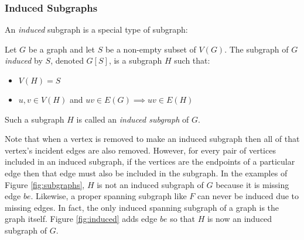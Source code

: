 \subsubsection{Induced Subgraphs}

An \emph{induced} subgraph is a special type of subgraph:

\begin{definition}
  Let \(G\) be a graph and let \(S\) be a non-empty subset of \(V(G)\).  The subgraph of \(G\) \emph{induced} by
  \(S\), denoted \(G[S]\), is a subgraph \(H\) such that:
  \begin{itemize}
  \item \(V(H)=S\)
  \item \(u,v\in V(H)\) and \(uv\in E(G)\implies uv\in E(H)\)
  \end{itemize}
  Such a subgraph \(H\) is called an \emph{induced subgraph} of \(G\).
\end{definition}

Note that when a vertex is removed to make an induced subgraph then all of that vertex's incident edges are also
removed.  However, for every pair of vertices included in an induced subgraph, if the vertices are the endpoints of
a particular edge then that edge must also be included in the subgraph.  In the examples of Figure
\ref{fig:subgraphs}, \(H\) is not an induced subgraph of \(G\) because it is missing edge \(be\).  Likewise, a
proper spanning subgraph like \(F\) can never be induced due to missing edges.  In fact, the only induced spanning
subgraph of a graph is the graph itself.  Figure \ref{fig:induced} adds edge \(be\) so that \(H\) is now an induced
subgraph of \(G\).


